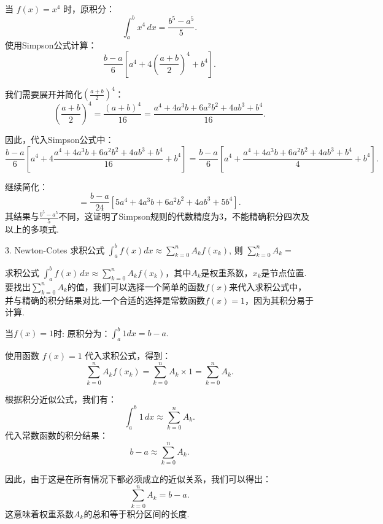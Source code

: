 \begin{tcolorbox}[enhanced,colback=10,colframe=9,breakable,coltitle=green!25!black,title=2024]
当 $f(x) = x^4$ 时，原积分：
$$\int_a^b x^4 \, dx = \frac{b^5 - a^5}{5}.$$
使用Simpson公式计算：
$$\frac{b-a}{6} \left[a^4 + 4\left(\frac{a+b}{2}\right)^4 + b^4\right].$$

我们需要展开并简化$\left(\frac{a+b}{2}\right)^4$：
$$\left(\frac{a+b}{2}\right)^4 = \frac{(a+b)^4}{16} = \frac{a^4 + 4a^3b + 6a^2b^2 + 4ab^3 + b^4}{16}.$$

因此，代入Simpson公式中：
$$\frac{b-a}{6} \left[a^4 + 4\frac{a^4 + 4a^3b + 6a^2b^2 + 4ab^3 + b^4}{16} + b^4\right] = \frac{b-a}{6} \left[a^4 + \frac{a^4 + 4a^3b + 6a^2b^2 + 4ab^3 + b^4}{4} + b^4\right].$$

继续简化：
$$= \frac{b-a}{24} \left[5a^4 + 4a^3b + 6a^2b^2 + 4ab^3 + 5b^4\right].$$
其结果与$\frac{b^5 - a^5}{5}$不同，这证明了Simpson规则的代数精度为3，不能精确积分四次及以上的多项式.

  \end{tcolorbox}

\begin{tcolorbox}[enhanced,colback=10,colframe=9,breakable,coltitle=green!25!black,title=2024]

3. Newton-Cotes 求积公式 $\displaystyle \int_{a}^{b} f(x) d x \approx \sum_{k=0}^{n} A_{k} f\left(x_{k}\right) $, 则 $
\displaystyle\sum_{k=0}^{n} A_{k}= $

\tcblower
求积公式 $\displaystyle \int_{a}^{b} f(x) \, dx \approx \sum_{k=0}^{n} A_{k} f\left(x_{k}\right)$，其中$A_k$是权重系数，$x_k$是节点位置.要找出$\sum\limits_{k=0}^{n} A_{k}$的值，我们可以选择一个简单的函数$f(x)$来代入求积公式中，并与精确的积分结果对比.一个合适的选择是常数函数$f(x) = 1$，因为其积分易于计算.

 当$f(x) = 1$时: 原积分为：$\displaystyle \int_a^b 1  d x = b - a.$
   
 使用函数 $f(x) = 1$ 代入求积公式，得到：
     $$
     \sum_{k=0}^{n} A_{k} f\left(x_{k}\right) = \sum_{k=0}^{n} A_{k} \times 1 = \sum_{k=0}^{n} A_{k}.
     $$
   
 根据积分近似公式，我们有：
     $$
     \int_a^b 1 \, dx \approx \sum_{k=0}^{n} A_{k}.
     $$
 代入常数函数的积分结果：
     $$
     b - a \approx \sum_{k=0}^{n} A_{k}.
     $$
   

   因此，由于这是在所有情况下都必须成立的近似关系，我们可以得出：
     $$
     \sum_{k=0}^{n} A_{k} = b - a.
     $$
    这意味着权重系数$A_k$的总和等于积分区间的长度.


  \end{tcolorbox}


